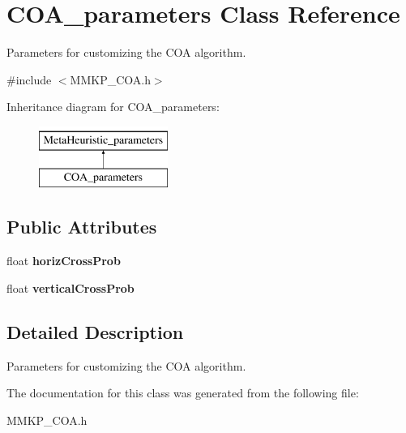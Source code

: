 \hypertarget{class_c_o_a__parameters}{\section{C\+O\+A\+\_\+parameters Class Reference}
\label{class_c_o_a__parameters}
}


Parameters for customizing the C\+O\+A algorithm.  




{\ttfamily \#include $<$M\+M\+K\+P\+\_\+\+C\+O\+A.\+h$>$}

Inheritance diagram for C\+O\+A\+\_\+parameters\+:\begin{figure}[H]
\begin{center}
\leavevmode
\includegraphics[height=2.000000cm]{class_c_o_a__parameters}
\end{center}
\end{figure}
\subsection*{Public Attributes}
\begin{DoxyCompactItemize}
\item 
\hypertarget{class_c_o_a__parameters_a99776299ecd47baa3ad846378004cd61}{float {\bfseries horiz\+Cross\+Prob}}\label{class_c_o_a__parameters_a99776299ecd47baa3ad846378004cd61}

\item 
\hypertarget{class_c_o_a__parameters_ae27375e8a8f7ad20911781cac20e4516}{float {\bfseries vertical\+Cross\+Prob}}\label{class_c_o_a__parameters_ae27375e8a8f7ad20911781cac20e4516}

\end{DoxyCompactItemize}


\subsection{Detailed Description}
Parameters for customizing the C\+O\+A algorithm. 

The documentation for this class was generated from the following file\+:\begin{DoxyCompactItemize}
\item 
M\+M\+K\+P\+\_\+\+C\+O\+A.\+h\end{DoxyCompactItemize}
